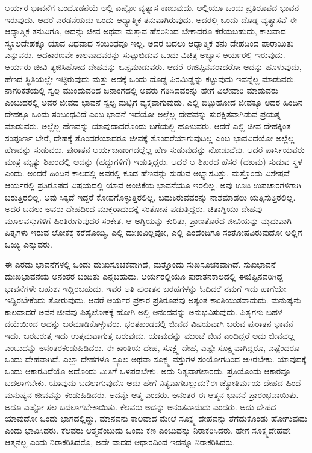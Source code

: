 ಆರ್ಯರ ಭಾವನೆಗೆ ಬಂದೊಡನೆಯೆ ಅಲ್ಲಿ ಎಷ್ಟೋ ವ್ಯತ್ಯಾಸ ಕಾಣುವುದು. ಅಲ್ಲಿಯೂ ಒಂದು ಪ್ರತಿರೂಪದ ಭಾವನೆ ಇರುವುದು. ಆದರೆ ಎರಡನೆಯದು ಒಂದು ಆಧ್ಯಾತ್ಮಿಕ ತನುವಾಗಿರುವುದು. ಅದರಲ್ಲಿ ಒಂದು ದೊಡ್ಡ ವ್ಯತ್ಯಾಸವೆ ಈ ಆಧ್ಯಾತ್ಮಿಕ ತನುವಿಗೂ, ಅದನ್ನು ಜೀವ ಅಥವಾ ಮತ್ತಾವ ಹೆಸರಿನಿಂದ ಬೇಕಾದರೂ ಕರೆಯಬಹುದು, ಕಾಲವಾದ ಸ್ಥೂಲದೇಹಕ್ಕೂ ಯಾವ ವಿಧವಾದ ಸಂಬಂಧವೂ ಇಲ್ಲ. ಅದರ ಬದಲು ಆಧ್ಯಾತ್ಮಿಕ ತನು ದೇಹದಿಂದ ಪಾರಾಯಿತು ಎನ್ನುವರು. ಆದಕಾರಣವೇ ಕಾಲವಾದವರನ್ನು ಸುಟ್ಟುಬಿಡುವ ಒಂದು ವಿಚಿತ್ರ ಅಭ್ಯಾಸ ಆರ್ಯರಲ್ಲಿ ಇರುವುದು. ಆರ್ಯರು ಜೀವಿ ತ್ಯಜಿಸಿಹೋದ ದೇಹವನ್ನು ಒಪ್ಪಮಾಡುವರು. ಆದರೆ ಈಜಿಪ್ಟಿನವರಾದರೋ ಅದನ್ನು ಹೂಳುವುದು, ಹೆಣದ ಸ್ಥಿತಿಯಲ್ಲೇ ಇಟ್ಟಿರುವುದು ಮತ್ತು ಅದಕ್ಕೆ ಒಂದು ದೊಡ್ಡ ಪಿರಮಿಡ್ಡನ್ನು ಕಟ್ಟುವುದು ಇವನ್ನೆಲ್ಲ ಮಾಡುವರು. ನಾಗರಿಕತೆಯಲ್ಲಿ ಸ್ವಲ್ಪ ಮುಂದುವರಿದ ಜನಾಂಗದಲ್ಲಿ ಅವರು ಗತಿಸಿದವರನ್ನು ಹೇಗೆ ವಿಲೇವಾರಿ ಮಾಡುವರು ಎಂಬುದರಲ್ಲಿ ಅವರ ಜೀವದ ಭಾವನೆ ಸ್ವಲ್ಪ ಮಟ್ಟಿಗೆ ವ್ಯಕ್ತವಾಗುವುದು. ಎಲ್ಲಿ ಬಿಟ್ಟುಹೋದ ಜೀವಕ್ಕೂ ಅದರ ಹಿಂದಿನ ದೇಹಕ್ಕೂ ಒಂದು ಸಂಬಂಧವಿದೆ ಎಂಬ ಭಾವನೆ ಇದೆಯೋ ಅಲ್ಲೆಲ್ಲ ದೇಹವನ್ನು ಸುರಕ್ಷಿತವಾಗಿಡುವ ಪ್ರಯತ್ನ ಮಾಡುವರು. ಅಲ್ಲೆಲ್ಲ ಹೆಣವನ್ನು ಯಾವುದಾದರೊಂದು ಬಗೆಯಲ್ಲಿ ಹೂಳುವರು. ಆದರೆ ಎಲ್ಲಿ ಜೀವ ದೇಹಕ್ಕಿಂತ ಸಂಪೂರ್ಣ ಬೇರೆ, ದೇಹಕ್ಕೆ ತೊಂದರೆಯಾದರೂ ಜೀವಕ್ಕೆ ತೊಂದರೆಯಾಗುವುದಿಲ್ಲ ಎಂಬ ಭಾವವಿದೆಯೋ ಅಲ್ಲೆಲ್ಲ ಹೆಣವನ್ನು ಸುಡುವರು. ಪುರಾತನ ಆರ್ಯಜನಾಂಗದಲ್ಲೆಲ್ಲ ಹೆಣ ಸುಡುವುದನ್ನು ನೋಡುವೆವು. ಆದರೆ ಪಾರ್ಸಿಯವರು ಮಾತ್ರ ಮೃತ್ಯು ಶಿಖರದಲ್ಲಿ ಅದನ್ನು (ಹದ್ದುಗಳಿಗೆ) ಇಡುತ್ತಿದ್ದರು. ಆದರೆ ಆ ಶಿಖರದ ಹೆಸರೆ (ದಖಮ) ಸುಡುವ ಸ್ಥಳ ಎಂದು. ಅಂದರೆ ಹಿಂದಿನ ಕಾಲದಲ್ಲಿ ಅವರಲ್ಲಿ ಕೂಡ ಹೆಣವನ್ನು ಸುಡುವ ಅಭ್ಯಾಸವಿತ್ತು. ಮತ್ತೊಂದು ವಿಶೇಷವೆ ಆರ್ಯರಲ್ಲಿ ಪ್ರತಿರೂಪದ ವಿಷಯದಲ್ಲಿ ಯಾವ ಅಂಜಿಕೆಯ ಭಾವನೆಯೂ ಇರಲಿಲ್ಲ. ಅವು ಊಟ ಉಪಚಾರಗಳಿಗಾಗಿ ಬರುತ್ತಿರಲಿಲ್ಲ. ಅವು ಸಿಕ್ಕದೆ ಇದ್ದರೆ ಕೋಪಗೊಳ್ಳುತ್ತಿರಲಿಲ್ಲ, ಬದುಕಿರುವವರನ್ನು ನಾಶಮಾಡಲು ಯತ್ನಿಸುತ್ತಿರಲಿಲ್ಲ. ಅದರ ಬದಲು ಅವರು ದೇಹದಿಂದ ಮುಕ್ತರಾದುದಕ್ಕೆ ಸಂತೋಷ ಪಡುತ್ತಿದ್ದರು. ಚಿತಾಗ್ನಿಯು ದೇಹವು ಮೂಲವಸ್ತುಗಳಿಗೆ ಹಿಂತಿರುಗುವುದರ ಸಂಕೇತ. ಆ ಅಗ್ನಿಯನ್ನು ಕುರಿತು, ಪ್ರಾಣತೊರೆದ ಜೀವಿಯನ್ನು ಮೃದುವಾಗಿ ಪಿತೃಗಳು ಇರುವ ಲೋಕಕ್ಕೆ ಕರೆದೊಯ್ಯಿ, ಎಲ್ಲಿ ದುಃಖವಿಲ್ಲವೋ, ಎಲ್ಲಿ ಎಂದೆಂದಿಗೂ ಸಂತೋಷವಿರುವುದೋ ಅಲ್ಲಿಗೆ ಒಯ್ಯಿ ಎನ್ನುವರು.

ಈ ಎರಡು ಭಾವನೆಗಳಲ್ಲಿ ಒಂದು ದುಃಖಸೂಚಕವಾಗಿದೆ, ಮತ್ತೊಂದು ಸುಖಸೂಚಕವಾಗಿದೆ. ಸುಖಭಾವನೆ ದುಃಖಭಾವನೆಯ ಅನಂತರ ಬಂದಿತು ಎನ್ನಬಹುದು. ಆರ್ಯರಲ್ಲಿಯೂ ಪುರಾತನಕಾಲದಲ್ಲಿ ಈಜಿಪ್ಟಿನವರಿಗಿದ್ದ ಭಾವನೆಗಳೇ ಬಹುಶಃ ಇದ್ದಿರಬಹುದು. ಇವರ ಅತಿ ಪುರಾತನ ಬರಹಗಳನ್ನು ಓದಿದರೆ ನಮಗೆ ಇದು ಹಾಗೆಯೇ ಇದ್ದಿರಬೇಕೆಂದು ತೋರುವುದು. ಆದರೆ ಆರ್ಯರ ಪ್ರಕಾರ ಪ್ರತಿರೂಪವು ಅತ್ಯಂತ ಕಾಂತಿಯುತವಾದುದು. ಮನುಷ್ಯನು ಕಾಲವಾದರೆ ಅವನ ಜೀವವು ಪಿತೃಲೋಕಕ್ಕೆ ಹೋಗಿ ಅಲ್ಲಿ ಆನಂದವನ್ನು ಅನುಭವಿಸುವುದು. ಪಿತೃಗಳು ಬಹಳ ದಯೆಯಿಂದ ಅದನ್ನು ಬರಮಾಡಿಕೊಳ್ಳುವರು. ಭರತಖಂಡದಲ್ಲಿ ಜೀವದ ವಿಷಯವಾಗಿ ಬರುವ ಪುರಾತನ ಭಾವನೆ ಇದು. ಬರಬರುತ್ತ ಇದು ಉತ್ತಮವಾಗುತ್ತ ಬರುವುದು. ಯಾವುದನ್ನು ಮುಂಚೆ ಜೀವ ಎಂದಿದ್ದರೆ ಅದು ಜೀವವಲ್ಲ ಎಂಬುದನ್ನು ಅನಂತರ\break ಕಂಡುಹಿಡಿದರು. ಈ ಕಾಂತಿಯ ದೇಹ, ಸೂಕ್ಷ್ಮ ದೇಹ, ಎಷ್ಟೇ ಸೂಕ್ಷ್ಮವಾಗಿದ್ದರೂ, ಎಷ್ಟೆಂದರೂ ಒಂದು ದೇಹವಾಗಿದೆ. ಎಲ್ಲಾ ದೇಹಗಳೂ ಸ್ಥೂಲ ಅಥವಾ ಸೂಕ್ಷ್ಮ ವಸ್ತುಗಳ ಸಂಯೋಗದಿಂದ ಆಗಿರಬೇಕು. ಯಾವುದಕ್ಕೆ ಒಂದು ಆಕಾರವಿದೆಯೊ ಅದೊಂದು ಮಿತಿಗೆ ಒಳಪಡಬೇಕು. ಅದು ನಿತ್ಯವಾಗಲಾರದು. ಪ್ರತಿಯೊಂದು ಆಕಾರವೂ ಬದಲಾಗಬೇಕು. ಯಾವುದು ಬದಲಾಗುವುದೊ ಅದು ಹೇಗೆ ನಿತ್ಯವಾಗಬಲ್ಲುದು?\break ಈ ಜ್ಯೋತಿರ್ಮಯ ದೇಹದ ಹಿಂದೆ ಮನುಷ್ಯನ ಜೀವವನ್ನು ಕಂಡುಹಿಡಿದರು. ಅದನ್ನೇ ಆತ್ಮ ಎಂದರು. ಆನಂತರ ಈ ಆತ್ಮನ ಭಾವನೆ ಪ್ರಾರಂಭವಾಯಿತು. ಅದೂ ಎಷ್ಟೋ ಸಲ ಬದಲಾಗಬೇಕಾಯಿತು. ಕೆಲವರು ಅದನ್ನು ಅನಂತವಾದುದು ಎಂದರು. ಅದು ದೇಹದ ಯಾವುದೋ ಒಂದು ಭಾಗದಲ್ಲಿದ್ದು, ಮಾನವನು ಕಾಲವಾದ ಮೇಲೆ ಸೂಕ್ಷ್ಮ ದೇಹವನ್ನು ತೆಗೆದುಕೊಂಡು ಹೋಗುವುದು ಎಂದು ಭಾವಿಸಿದರು. ಕೆಲವರು ಆತ್ಮವೆಂಬುದು ಒಂದು ಕಣ ಎಂಬುದನ್ನು ನಿರಾಕರಿಸಿದರು. ಹೇಗೆ ಸೂಕ್ಷ್ಮದೇಹವೇ ಆತ್ಮನಲ್ಲ ಎಂದು ನಿರಾಕರಿಸಿದರೊ, ಅದೇ ವಾದದ ಆಧಾರದಿಂದ ಇದನ್ನೂ ನಿರಾಕರಿಸಿದರು.

